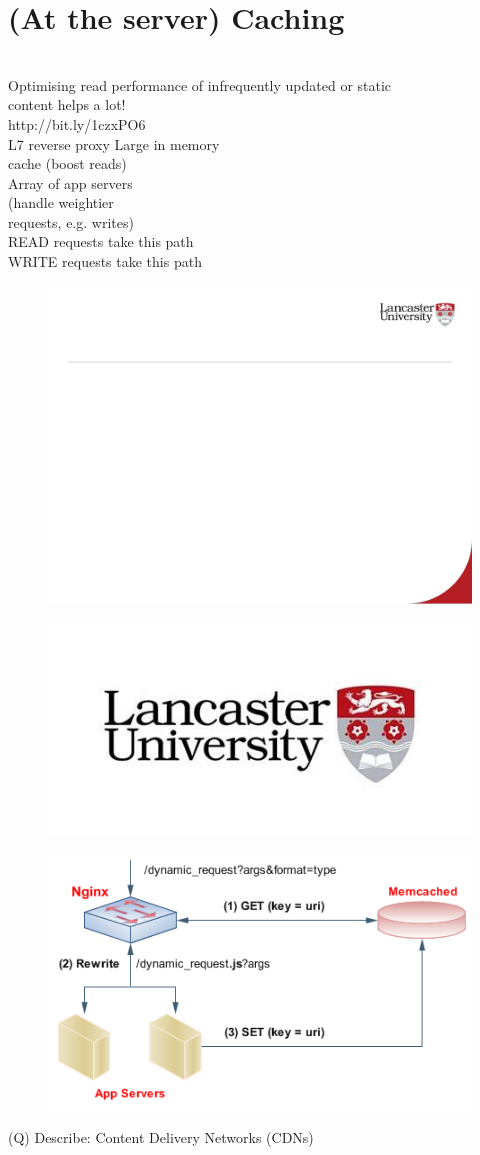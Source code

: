 \documentclass[12pt]{article}
\begin{document}
\section{(At the server) Caching}
\\
Optimising read performance of infrequently updated or static \\
content helps a lot!\\
http://bit.ly/1czxPO6\\
L7 reverse proxy Large in memory \\
cache (boost reads)\\
Array of app servers \\
(handle weightier \\
requests, e.g. writes)\\
READ requests take this path\\
WRITE requests take this path\\
\begin{figure}[H]
\includegraphics[width=0.5\linewidth]{page84-image-1.png}
\end{figure}
\begin{figure}[H]
\includegraphics[width=0.5\linewidth]{page84-image-2.png}
\end{figure}
\begin{figure}[H]
\includegraphics[width=0.5\linewidth]{page84-image-3.png}
\end{figure}
\clearpage
(Q)
Describe: Content Delivery Networks (CDNs)
\clearpage
\end{document}
